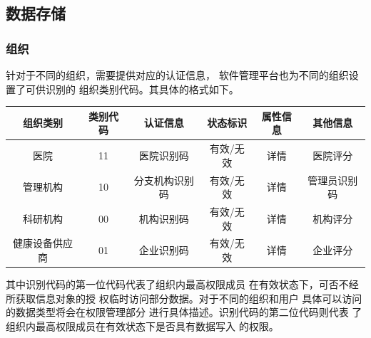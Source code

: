 \documentclass[UTF8]{ctexart}
\begin{document}
    \subsection{数据存储}
    \subsubsection{组织}
    针对于不同的组织，需要提供对应的认证信息，
    软件管理平台也为不同的组织设置了可供识别的
    组织类别代码。其具体的格式如下。
    \begin{center}
    \begin{tabular}{cccccc}
        \hline
        组织类别& 类别代码& 认证信息& 状态标识& 属性信息& 其他信息\\
        \hline
        医院& 11& 医院识别码& 有效/无效& 详情& 医院评分\\
        管理机构& 10& 分支机构识别码& 有效/无效& 详情& 管理员识别码\\
        科研机构& 00& 机构识别码& 有效/无效& 详情& 机构评分\\
        健康设备供应商& 01& 企业识别码& 有效/无效& 详情& 企业评分\\
        \hline
    \end{tabular}
    \end{center}
    \par
    其中识别代码的第一位代码代表了组织内最高权限成员
    在有效状态下，可否不经所获取信息对象的授
    权临时访问部分数据。对于不同的组织和用户
    具体可以访问的数据类型将会在权限管理部分
    进行具体描述。识别代码的第二位代码则代表
    了组织内最高权限成员在有效状态下是否具有数据写入
    的权限。
\end{document}
